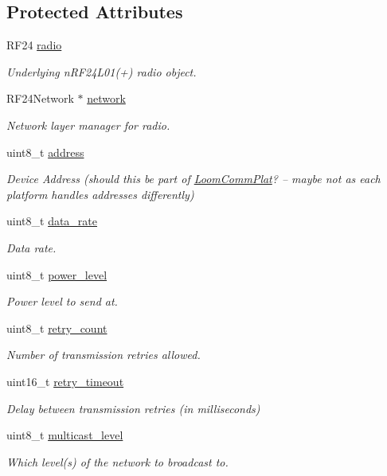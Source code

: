 \subsection*{Protected Attributes}
\begin{DoxyCompactItemize}
\item 
R\+F24 \hyperlink{class_loom__n_r_f_a785fc4d36d622edea8a8a1e35de80e88}{radio}
\begin{DoxyCompactList}\small\item\em Underlying n\+R\+F24\+L01(+) radio object. \end{DoxyCompactList}\item 
R\+F24\+Network $\ast$ \hyperlink{class_loom__n_r_f_ac9f3accb15e32baa80557f03da7a4990}{network}
\begin{DoxyCompactList}\small\item\em Network layer manager for radio. \end{DoxyCompactList}\item 
uint8\+\_\+t \hyperlink{class_loom__n_r_f_a9bd096cf262ff923c4ba8e8cbd85d63b}{address}
\begin{DoxyCompactList}\small\item\em Device Address (should this be part of \hyperlink{class_loom_comm_plat}{Loom\+Comm\+Plat}? – maybe not as each platform handles addresses differently) \end{DoxyCompactList}\item 
uint8\+\_\+t \hyperlink{class_loom__n_r_f_aa07c72a33cf70c119ff333b3177aadd0}{data\+\_\+rate}
\begin{DoxyCompactList}\small\item\em Data rate. \end{DoxyCompactList}\item 
uint8\+\_\+t \hyperlink{class_loom__n_r_f_a47eb5605398f1d83febef1c0ec3ef27b}{power\+\_\+level}
\begin{DoxyCompactList}\small\item\em Power level to send at. \end{DoxyCompactList}\item 
uint8\+\_\+t \hyperlink{class_loom__n_r_f_a53c54395b6ac8e89b8c3a0b3d582a9fe}{retry\+\_\+count}
\begin{DoxyCompactList}\small\item\em Number of transmission retries allowed. \end{DoxyCompactList}\item 
uint16\+\_\+t \hyperlink{class_loom__n_r_f_a57f2765c35a200cf53ad055f5e1bef13}{retry\+\_\+timeout}
\begin{DoxyCompactList}\small\item\em Delay between transmission retries (in milliseconds) \end{DoxyCompactList}\item 
uint8\+\_\+t \hyperlink{class_loom__n_r_f_a91e29e17ba984dc899ca11507adfd9f9}{multicast\+\_\+level}
\begin{DoxyCompactList}\small\item\em Which level(s) of the network to broadcast to. \end{DoxyCompactList}\end{DoxyCompactItemize}
